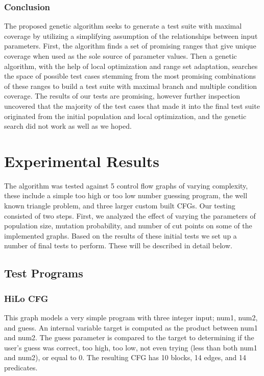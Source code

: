 \documentclass[runningheads]{llncs}
\begin{document}
\subsubsection{Conclusion}
The proposed genetic algorithm seeks to generate a test suite with maximal coverage by utilizing a simplifying assumption of the relationships between input parameters. First, the algorithm finds a set of promising ranges that give unique coverage when used as the sole source of parameter values. Then a genetic algorithm, with the help of local optimization and range set adaptation, searches the space of possible test cases stemming from the most promising combinations of these ranges to build a test suite with maximal branch and multiple condition coverage. The results of our tests are promising, however further inspection uncovered that the majority of the test cases that made it into the final test suite originated from the initial population and local optimization, and the genetic search did not work as well as we hoped. 


\newpage

\section{Experimental Results}

The algorithm was tested against 5 control flow graphs of varying complexity, these include a simple too high or too low number guessing program, the well known triangle problem, and three larger custom built CFGs. Our testing consisted of two steps. First, we analyzed the effect of varying the parameters of population size, mutation probability, and number of cut points on some of the implemented graphs. Based on the results of these initial tests we set up a number of final tests to perform. These will be described in detail below. 
  
\subsection{Test Programs}

\subsubsection{HiLo CFG}
This graph models a very simple program with three integer input; num1, num2, and guess. An internal variable target is computed as the product between num1 and num2. The guess parameter is compared to the target to determining if the user's guess was correct, too high, too low, not even trying (less than both num1 and num2), or equal to 0. The resulting CFG has 10 blocks, 14 edges, and 14 predicates.
\end{document}
